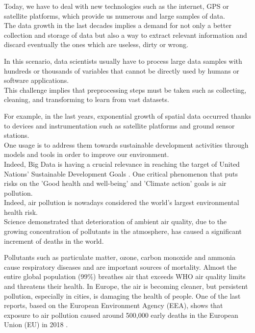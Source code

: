 Today, we have to deal with new technologies such as the internet, GPS or satellite platforms, which provide us numerous and large samples of data.\\ 
The data growth in the last decades implies a demand for not only a better collection and storage of data but also a way to extract relevant information and discard eventually the ones which are useless, dirty or wrong.\par
In this scenario, data scientists usually have to process large data samples with hundreds or thousands of variables that  \cite{garcia2016big} cannot be directly used by humans or software applications.\\
This challenge implies that preprocessing steps must be taken such as collecting, cleaning, and transforming to learn from vast datasets.\par
For example, in the last years, exponential growth of spatial data occurred thanks to devices and instrumentation such as satellite platforms and ground sensor stations. \\
One usage is to address them towards sustainable development activities through models and tools in order to improve our environment. \\
Indeed, Big Data is having a crucial relevance in reaching the target of United Nations’ Sustainable Development Goals  \cite{zhang2019orchestrating}.
One critical phenomenon that puts risks on the 'Good health and well-being' and 'Climate action' goals is air pollution.\\
Indeed, air pollution is nowadays considered the world's largest environmental health risk.\\
Science demonstrated that deterioration of ambient air quality, due to the growing concentration of pollutants in the atmosphere, has caused a significant increment of deaths in the world.\par  
Pollutants such as particulate matter, ozone, carbon monoxide and ammonia cause respiratory diseases and are important sources of mortality.
Almost the entire global population (99\%) breathes air that exceeds WHO air quality limits and threatens their health.\newline
In Europe, the air is becoming cleaner, but persistent pollution, especially in cities, is damaging the health of people. One of the last reports, based on the European Environment Agency (EEA), shows that exposure to air pollution caused around 500,000 early deaths in the European Union (EU) in 2018  \cite{european2018air}.\par
